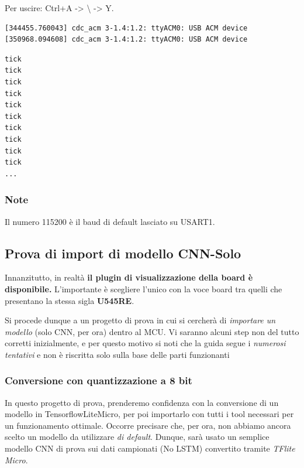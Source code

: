 Per uscire: Ctrl+A -> \textbackslash{} -> Y. 

\begin{lstlisting}[language=bash]
[344455.760043] cdc_acm 3-1.4:1.2: ttyACM0: USB ACM device
[350968.094608] cdc_acm 3-1.4:1.2: ttyACM0: USB ACM device
\end{lstlisting}


\begin{lstlisting}[language=bash]
tick
tick
tick
tick
tick
tick
tick
tick
tick
tick
...
\end{lstlisting}

\subsubsection{Note}
Il numero 115200 è il baud di default lasciato su USART1.

\subsection{Prova di import di modello CNN-Solo}
Innanzitutto, in realtà \textbf{il plugin di visualizzazione della board è disponibile.} L'importante è scegliere l'unico con la voce board tra quelli che presentano la stessa sigla \textbf{U545RE}.

Si procede dunque a un progetto di prova in cui si cercherà di \textit{importare un modello} (solo CNN, per ora) dentro al MCU. Vi saranno alcuni step non del tutto corretti inizialmente, e per questo motivo si noti che la guida segue i \textit{numerosi tentativi} e non è riscritta solo sulla base delle parti funzionanti

\subsubsection{Conversione con quantizzazione a 8 bit}
In questo progetto di prova, prenderemo confidenza con la conversione di un modello in TensorflowLiteMicro, per poi importarlo con tutti i tool necessari per un funzionamento ottimale. Occorre precisare che, per ora, non abbiamo ancora scelto un modello da utilizzare \textit{di default}. Dunque, sarà usato un semplice modello CNN di prova sui dati campionati (No LSTM) convertito tramite \textit{TFlite Micro}.

